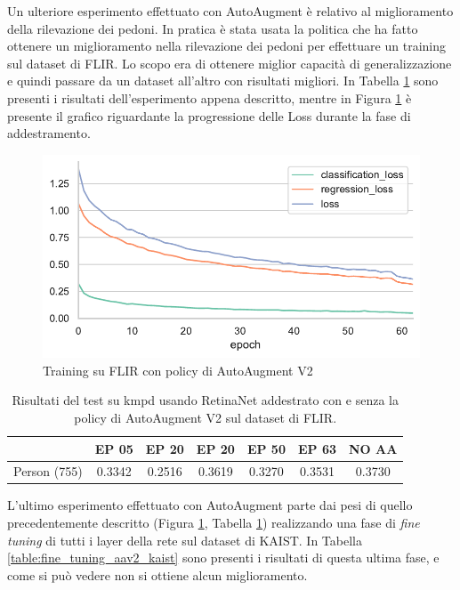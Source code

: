 Un ulteriore esperimento effettuato con AutoAugment è relativo al miglioramento della rilevazione dei pedoni. In pratica è stata usata la politica che ha fatto ottenere un miglioramento nella rilevazione dei pedoni per effettuare un training sul dataset di FLIR. Lo scopo era di ottenere miglior capacità di generalizzazione e quindi passare da un dataset all'altro con risultati migliori. In Tabella \ref{table:tl_flir_kaist_aav2} sono presenti i risultati dell'esperimento appena descritto, mentre in Figura \ref{fig:AA_v2} è presente il grafico riguardante la progressione delle Loss durante la fase di addestramento. 
\begin{figure}[]
    \centering
    \includegraphics[width=\textwidth]{images/graphic/train_aa_flir_v2.pdf}
    \caption{Training su FLIR con policy di AutoAugment V2}
    \label{fig:AA_v2}
\end{figure}

\begin{table}[]
    \begin{tabular}{c|c|c|c|c|c|c|}
    \cline{2-7}
     & EP 05 & EP 20 & EP 20 & EP 50 & EP 63 & NO AA\\ \hline
    \multicolumn{1}{|c|}{Person (755)} & 0.3342 & 0.2516 & 0.3619 & 0.3270 & 0.3531 & 0.3730 \\ \hline
    \end{tabular}
    \caption{Risultati del test su \ac{kmpd} usando RetinaNet addestrato con e senza la policy di AutoAugment V2 sul dataset di FLIR.}
    \label{table:tl_flir_kaist_aav2}
\end{table}

L'ultimo esperimento effettuato con AutoAugment parte dai pesi di quello precedentemente descritto (Figura \ref{fig:AA_v2}, Tabella \ref{table:tl_flir_kaist_aav2}) realizzando una fase di \textit{fine tuning} di tutti i layer della rete sul dataset di KAIST. In Tabella \ref{table:fine_tuning_aav2_kaist} sono presenti i risultati di questa ultima fase, e come si può vedere non si ottiene alcun miglioramento. 

